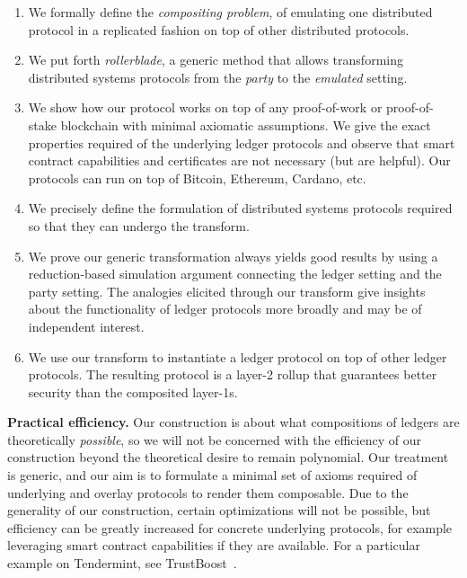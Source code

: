 \begin{enumerate}
  \item We formally define the \emph{compositing problem}, of emulating
        one distributed protocol in a replicated fashion on top of other
        distributed protocols.
  \item We put forth \emph{rollerblade}, a generic method that allows transforming
        distributed systems protocols from the \emph{party} to the \emph{emulated}
        setting.
  \item We show how our protocol works on top of any proof-of-work or proof-of-stake
        blockchain with minimal axiomatic assumptions. We give the exact properties
        required of the underlying ledger protocols and observe that smart contract
        capabilities and certificates are not necessary (but are helpful). Our
        protocols can run on top of Bitcoin, Ethereum, Cardano, etc.
  \item We precisely define the formulation of distributed systems protocols
        required so that they can undergo the \rollerblade transform.
  \item We prove our generic transformation always yields good results by
        using a reduction-based simulation argument connecting the
        ledger setting and the party setting. The analogies elicited through
        our transform give insights about the functionality of ledger protocols
        more broadly and may be of independent interest.
  \item We use our transform to instantiate a ledger protocol on top of
        other ledger protocols. The resulting protocol is a layer-2 rollup that
        guarantees better security than the composited layer-1s.
\end{enumerate}

\noindent
\textbf{Practical efficiency.}
Our construction is about what compositions of ledgers are theoretically \emph{possible},
so we will not be concerned with the efficiency of our construction beyond the
theoretical desire to remain polynomial. Our treatment
is generic, and our aim is to formulate a minimal set of axioms
required of underlying and overlay protocols to render them composable.
Due to the generality of our construction, certain optimizations will not be
possible, but efficiency can be greatly increased for concrete underlying
protocols, for example leveraging smart contract capabilities if they are
available. For a particular example on Tendermint, see TrustBoost~\cite{trustboost}.

